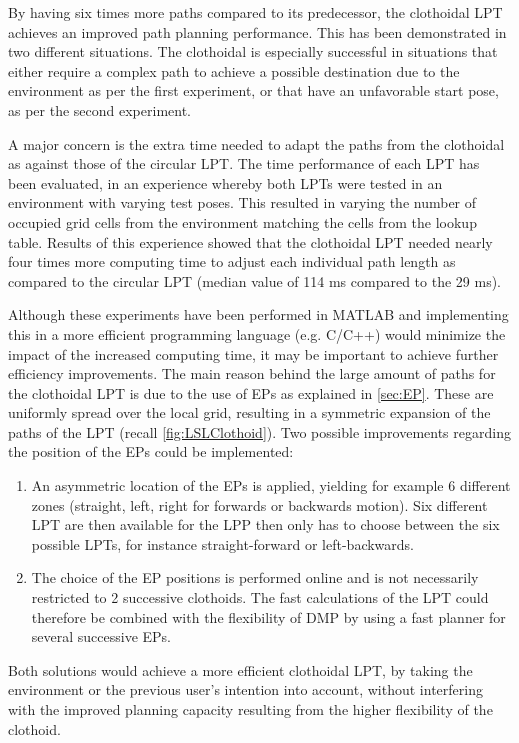 By having six times more paths compared to its predecessor, the clothoidal LPT achieves an improved path planning performance. This has been demonstrated in two different situations. The clothoidal is especially successful in situations that either require a complex path to achieve a possible destination due to the environment as per the first experiment, or that have an unfavorable start pose, as per the second experiment.

 A major concern is the extra time needed to adapt the paths from the clothoidal as against those of the circular LPT. The time performance of each LPT has been evaluated, in an experience whereby both LPTs were tested in an environment with varying test poses. This resulted in varying the number of occupied grid cells from the environment matching the cells from the lookup table. Results of this experience showed that the clothoidal LPT needed nearly four times more computing time to adjust each individual path length as compared to the circular LPT (median value of 114 ms compared to the 29 ms). 
 
 Although these experiments have been performed in MATLAB and implementing this in a more efficient programming language (e.g. C/C++) would minimize the impact of the increased computing time, it may be important to achieve further efficiency improvements. The main reason behind the large amount of paths for the clothoidal LPT is due to the use of EPs as explained in \cref{sec:EP}. These are uniformly spread over the local grid, resulting in a symmetric expansion of the paths of the LPT (recall \cref{fig:LSLClothoid}). Two possible improvements regarding the position of the EPs could be implemented:
\begin{enumerate}
\item An asymmetric location of the EPs is applied, yielding for example 6 different zones (straight, left, right for forwards or backwards motion). Six different LPT are then available for the LPP then only has to choose between the six possible LPTs, for instance straight-forward or left-backwards.
\item The choice of the EP positions is performed online and is not necessarily restricted to 2 successive clothoids.  The fast calculations of the LPT could therefore be combined with the flexibility of DMP by using a fast planner for several successive EPs. 
\end{enumerate}
Both solutions would achieve a more efficient clothoidal LPT, by taking the environment or the previous user’s intention into account, without interfering with the improved planning capacity resulting from the higher flexibility of the clothoid.
